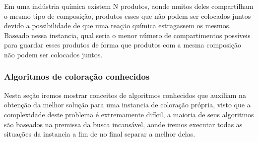 \documentclass[12pt]{article}
\begin{document}
   Em uma indústria química existem N produtos, aonde muitos deles compartilham o mesmo tipo de composição, produtos esses que não podem ser colocados juntos devido a possibilidade de que uma reação química estragassem os mesmos. Baseado nessa instancia, qual seria o menor número de compartimentos possíveis para guardar esses produtos de forma que produtos com a mesma composição não podem ser colocados juntos.

	\subsubsection{Algoritmos de coloração conhecidos}
	
	Nesta seção iremos mostrar conceitos de algoritmos conhecidos que auxiliam na obtenção da melhor solução para uma instancia de coloração própria, visto que a complexidade deste problema é extremamente difícil, a maioria de seus algoritmos são baseados na premissa da busca incansável, aonde iremos executar todas as situações da instancia a fim de no final separar a melhor delas.
	
\end{document}
